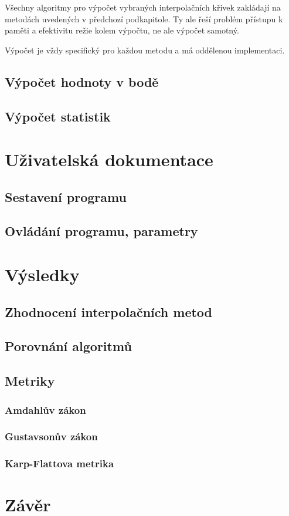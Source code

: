 \documentclass[]{thesiskiv}
\begin{document}
Všechny algoritmy pro výpočet vybraných interpolačních křivek zakládají na metodách uvedených v předchozí podkapitole. Ty ale řeší problém přístupu k paměti a efektivitu režie kolem výpočtu, ne ale výpočet samotný.

Výpočet je vždy specifický pro každou metodu a má oddělenou implementaci.




\section{Výpočet hodnoty v bodě}

\section{Výpočet statistik}




\chapter{Uživatelská dokumentace}

\section{Sestavení programu}

\section{Ovládání programu, parametry}




\chapter{Výsledky}

\section{Zhodnocení interpolačních metod}

\section{Porovnání algoritmů}

\section{Metriky}

\subsection{Amdahlův zákon}

\subsection{Gustavsonův zákon}

\subsection{Karp-Flattova metrika}




\chapter{Závěr}
\end{document}
